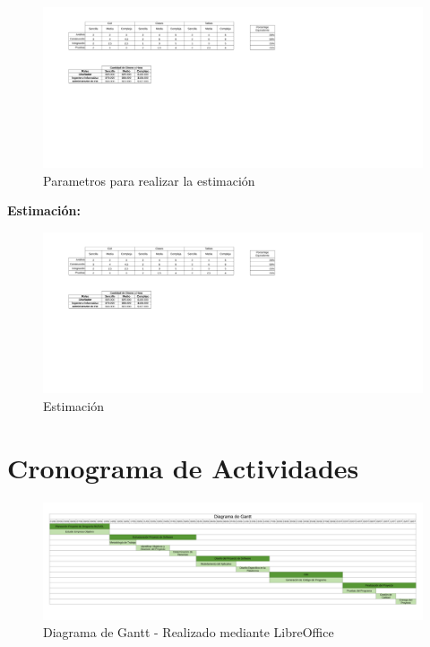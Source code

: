 \begin{figure}[h!]
	\centering
	\includegraphics[width=1.2\linewidth]{libro/capitulo4/img/PROBE.pdf}
	\caption{Parametros para realizar la estimaci\'on}
\end{figure}
\newpage
\textbf{Estimaci\'on:}
\begin{figure}[h!]
	\centering
	\includegraphics[width=1.2\linewidth]{libro/capitulo4/img/PROBE.pdf}
	\caption{Estimaci\'on}
\end{figure}


\section{Cronograma de Actividades}
\begin{figure}[h!]
	\centering
	\includegraphics[width=0.8\linewidth]{capitulo4/img/Gantt.pdf}
	\caption{Diagrama de Gantt - Realizado mediante LibreOffice}
\end{figure}

